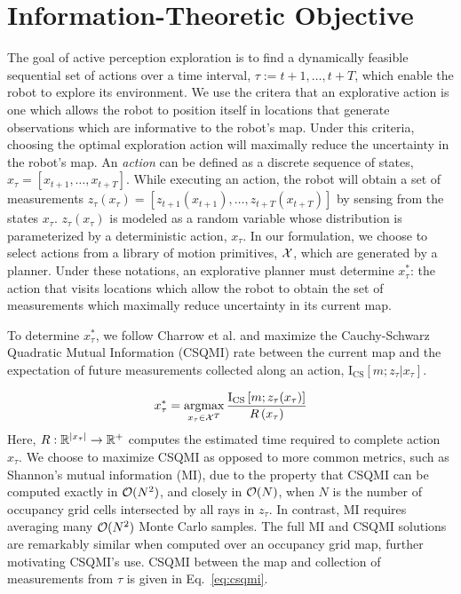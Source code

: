 \section{Information-Theoretic Objective}
\label{sec:information_theoretic_objective}

The goal of active perception exploration is to find a dynamically feasible
sequential set of actions over a time interval, $\tau := t+1,\dots,t+T$, which
enable the robot to explore its environment. We use the critera that an
explorative action is one which allows the robot to position itself in locations
that generate observations which are informative to the robot's map. Under this
criteria, choosing the optimal exploration action will maximally reduce the
uncertainty in the robot's map. An \textit{action} can be defined as a discrete sequence of
states, $x_{\tau} = \left[x_{t+1},\dots,x_{t+T}\right]$. While executing an action,
the robot will obtain a set of measurements $z_{\tau}(x_{\tau}) =
\left[z_{t+1}(x_{t+1}),\dots,z_{t+T}(x_{t+T})\right]$ by sensing from the states
$x_{\tau}$. $z_{\tau}(x_{\tau})$ is modeled as a random variable whose distribution
is parameterized by a deterministic action, $x_{\tau}$. In our formulation, we
choose to select actions from a library of motion primitives, $\mathcal{X}$, which
are generated by a planner. Under these notations, an explorative planner must
determine $x_{\tau}^{*}$: the action that visits locations which allow the robot
to obtain the set of measurements which maximally reduce uncertainty in its
current map.

To determine $x_{\tau}^{*}$, we follow Charrow et al. \cite{charrow15} and maximize the
Cauchy-Schwarz Quadratic Mutual Information (CSQMI) rate between the current map and the
expectation of future measurements collected along an action, $\text{I}_{\text{CS}}[m; z_{\tau} \vert
x_{\tau}]$.

\begin{align}
  \begin{split}
    x_{\tau}^{*}
    &=
    \argmax_{x_{\tau} \in \mc{X}^{T}}
    \frac{\text{I}_{\text{CS}}
      \left[
        m
        ;
        z_{\tau}(x_{\tau})
      \right]
    }
    {R\left(x_{\tau}\right)} \\
    \label{eq:mutual_information}
  \end{split}
\end{align}
%
Here, $R : {\mathbb{R}}^{\vert x_{\tau} \vert} \rightarrow {\mathbb{R}}^{+}$ computes the
estimated time required to complete action $x_{\tau}$. We choose to maximize
CSQMI as opposed to more common metrics, such as Shannon's mutual information
(MI), due to the property that CSQMI can be computed exactly
in $\mathcal{O}(N^{2})$, and closely in $\mathcal{O}(N)$, when $N$ is the number of occupancy
grid cells intersected by all rays in $z_{\tau}$. In contrast,
MI requires averaging many $\mathcal{O}(N^{2})$ Monte Carlo
samples. The full MI and CSQMI solutions are remarkably similar when computed
over an occupancy grid map, further motivating CSQMI's use. CSQMI between the
map and collection of measurements from $\tau$ is given in
Eq.~\eqref{eq:csqmi}.

